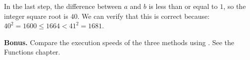 \documentclass[11pt,class=report,crop=false]{standalone}
\begin{document}
\begin{activite}
\begin{enumerate}
\medskip

In the last step, the difference between $a$ and $b$ is less than or equal to $1$, so the integer square root is $40$. We can verify that this is correct because: $40^2 = 1600 \le 1664 < 41^2 = 1681$.
    
\end{enumerate}  
  
  \smallskip
  
\textbf{Bonus.} Compare the execution speeds of the three methods using . See the \og{}Functions\fg{} chapter.

\end{activite}



\end{document}
